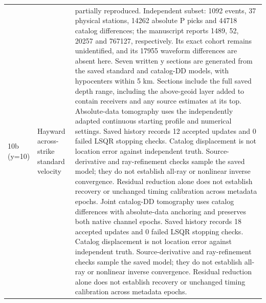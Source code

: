 \begin{longtable}{>{\raggedright\arraybackslash}p{}>{\raggedright\arraybackslash}p{}>{\raggedright\arraybackslash}p{}}
10b (y=10) & Hayward across-strike standard velocity & partially reproduced. Independent subset: 1092 events, 37 physical stations, 14262 absolute P picks and 44718 catalog differences; the manuscript reports 1489, 52, 20257 and 767127, respectively. Its exact cohort remains unidentified, and its 17955 waveform differences are absent here. Seven written y sections are generated from the saved standard and catalog-DD models, with hypocenters within 5 km. Sections include the full saved depth range, including the above-geoid layer added to contain receivers and any source estimates at its top. Absolute-data tomography uses the independently adapted continuous starting profile and numerical settings. Saved history records 12 accepted updates and 0 failed LSQR stopping checks. Catalog displacement is not location error against independent truth. Source-derivative and ray-refinement checks sample the saved model; they do not establish all-ray or nonlinear inverse convergence. Residual reduction alone does not establish recovery or unchanged timing calibration across metadata epochs. Joint catalog-DD tomography uses catalog differences with absolute-data anchoring and preserves both native channel epochs. Saved history records 18 accepted updates and 0 failed LSQR stopping checks. Catalog displacement is not location error against independent truth. Source-derivative and ray-refinement checks sample the saved model; they do not establish all-ray or nonlinear inverse convergence. Residual reduction alone does not establish recovery or unchanged timing calibration across metadata epochs.\\

\end{longtable}
